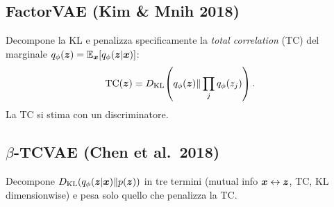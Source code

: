 \subsection{FactorVAE (Kim \& Mnih 2018)}
Decompone la KL e penalizza specificamente la \emph{total correlation} (TC) del marginale $q_\phi(\bm{z}) = \mathbb{E}_{\bm{x}}[q_\phi(\bm{z}|\bm{x})]$:
\[
\text{TC}(\bm{z}) = D_{\mathrm{KL}}\!\left(q_\phi(\bm{z}) \| \prod_j q_\phi(z_j)\right).
\]
La TC si stima con un discriminatore.

\subsection{$\beta$-TCVAE (Chen et al.\ 2018)}
Decompone $D_{\mathrm{KL}}\!\left(q_\phi(\bm{z}|\bm{x}) \| p(\bm{z})\right)$ in tre termini (mutual info $\bm{x}\leftrightarrow\bm{z}$, TC, KL dimensionwise) e pesa solo quello che penalizza la TC.

